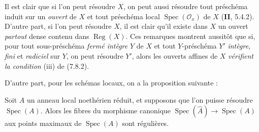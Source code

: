 \begin{env}[7.9.2]
\label{IV.2.s7.9.2-fr}
Il est clair que si l'on peut résoudre $X$, on peut aussi résoudre tout
préschéma induit sur un \emph{ouvert} de $X$ et tout préschéma local
$\operatorname{Spec}(\mathcal O_x)$ de $X$ (\textbf{II}, 5.4.2). D'autre part,
si l'on peut résoudre $X$, il est clair qu'il existe dans $X$ un ouvert
\emph{partout} dense contenu dans $\operatorname{Reg}(X)$. Ces remarques
montrent aussitôt que si, pour tout sous-préschéma \emph{fermé intègre} $Y$ de
$X$ et tout $Y$-préschéma $Y'$ \emph{intègre, fini} et \emph{radiciel} sur
$Y$, on peut résoudre $Y'$, alors les ouverts affines de $X$ \emph{vérifient
la condition} (iii) de (7.8.2).

D'autre part, pour les schémas locaux, on a la proposition suivante :
\end{env}

\begin{proposition}[7.9.3]
\label{IV.2.s7.9.3-fr}
Soit $A$ un anneau local noethérien réduit, et supposons que l'on puisse
résoudre $\operatorname{Spec}(A)$. Alors les fibres du morphisme canonique
$\operatorname{Spec}(\widehat A)\to\operatorname{Spec}(A)$ aux points maximaux
de $\operatorname{Spec}(A)$ sont régulières.
\end{proposition}

